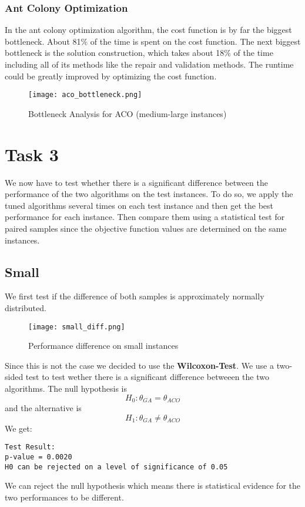 \documentclass{article}
\begin{document}
\subsubsection{Ant Colony Optimization}
In the ant colony optimization algorithm, the cost function is by far the biggest bottleneck. About 81\% of the time is spent on the cost function.
The next biggest bottleneck is the solution construction, which takes about 18\% of the time including all of its methods like the repair and validation methods.
The runtime could be greatly improved by optimizing the cost function.

\begin{figure}[H]
    \centering
    \texttt{[image: aco\_bottleneck.png]}
    \caption{Bottleneck Analysis for ACO (medium-large instances)}
    \label{fig:aco_bottleneck}
\end{figure}

\section{Task 3}

We now have to test whether there is a significant difference between the performance of the two algorithms on the test instances. To do so, we apply the tuned algorithms several times on each test instance and then get the best performance for each instance. Then compare them using a statistical test for paired samples since the objective function values are determined on the same instances. 
\subsection{Small}
We first test if the difference of both samples is approximately normally distributed.
\begin{figure}[H]
    \centering
    \texttt{[image: small\_diff.png]}
    \caption{Performance difference on small instances}
    \label{fig:enter-label}
\end{figure}
 Since this is not the case we decided to use the \textbf{Wilcoxon-Test}.  We use a two-sided test to test wether there is a significant difference betweeen the two algorithms. The null hypothesis is $$
 H_0 : \theta_{GA} = \theta_{ACO} $$
 and the alternative is
 $$
 H_1 : \theta_{GA} \neq \theta_{ACO}
 $$
 We get: 
 \begin{verbatim}
Test Result: 
p-value = 0.0020 
H0 can be rejected on a level of significance of 0.05 
 \end{verbatim}
 We can reject the null hypothesis which means there is statistical evidence for the two performances to be different.
\end{document}
